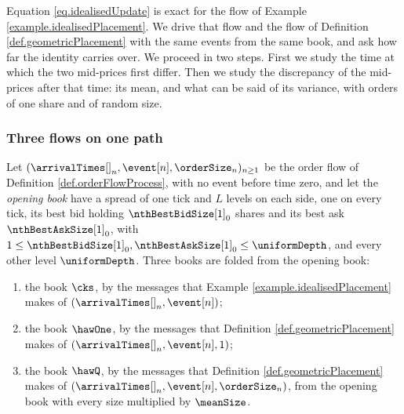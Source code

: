 Equation \eqref{eq.idealisedUpdate} is exact for the flow of
Example \ref{example.idealisedPlacement}.
We drive that flow and the flow of Definition \ref{def.geometricPlacement}
with the same events from the same book,
and ask how far the identity carries over.
We proceed in two steps.
First we study the time at which the two mid-prices first differ.
Then we study the discrepancy of the mid-prices after that time:
its mean, and what can be said of its variance,
with orders of one share and of random size.

\subsubsection{Three flows on one path}
\label{sec.threeFlows}

\begin{defi}\label{def.threeBooks}
 Let $(\arrivalTimes[]_n, \event[n], \orderSize_n)_{n \geq 1}$ be the order flow of
 Definition \ref{def.orderFlowProcess},
 with no event before time zero,
 and let the \emph{opening book} have a spread of one tick
 and $L$ levels on each side,
 one on every tick,
 its best bid holding $\nthBestBidSize[1]_0$ shares and its best ask $\nthBestAskSize[1]_0$,
 with $1 \leq \nthBestBidSize[1]_0, \nthBestAskSize[1]_0 \leq \uniformDepth$,
 and every other level $\uniformDepth$.
 Three books are folded from the opening book:
 \begin{enumerate}[label={\emph{\roman{*}}.}]
  \item the book $\cks$,
        by the messages that Example \ref{example.idealisedPlacement} makes of
        $(\arrivalTimes[]_n, \event[n])$;
  \item the book $\hawOne$,
        by the messages that Definition \ref{def.geometricPlacement} makes of
        $(\arrivalTimes[]_n, \event[n], 1)$;
  \item the book $\hawQ$,
        by the messages that Definition \ref{def.geometricPlacement} makes of
        $(\arrivalTimes[]_n, \event[n], \orderSize_n)$,
        from the opening book with every size multiplied by $\meanSize$.
 \end{enumerate}
\end{defi}

